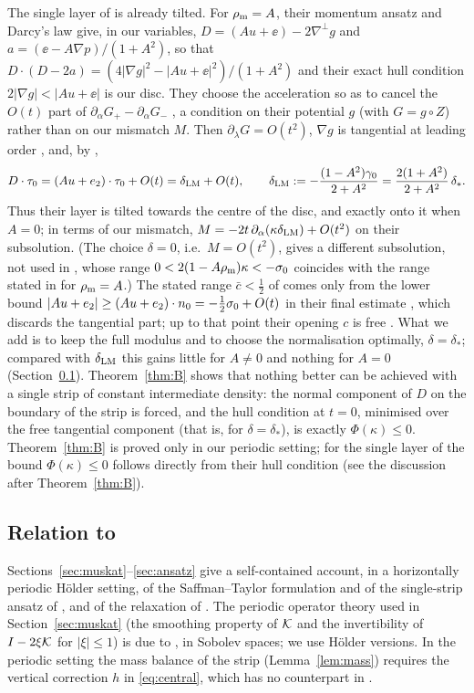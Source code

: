 The single layer of \cite{LM26} is already tilted. For $\rho_{\mathrm m}=A$, their momentum ansatz \cite[(4.6)]{LM26} and Darcy's law \cite[(4.10)]{LM26} give, in our variables, $D=(Au+\ee)-2\nabla^\perp g$ and
$a=(\ee-A\nabla p)/(1+A^2)$, so that $D\cdot(D-2a)=(4|\nabla g|^2-|Au+\ee|^2)/(1+A^2)$ and their exact hull condition $2|\nabla g|<|Au+\ee|$ \cite[(4.14)]{LM26} is our disc. They choose the
acceleration so as to cancel the $O(t)$ part of $\partial_\alpha G_+-\partial_\alpha G_-$ \cite[Sec.~3.3.4 and Lemma~5.3]{LM26}, a condition on their potential $g$ (with $G=g\circ Z$) rather than on
our mismatch $M$. Then $\partial_\lambda G=O(t^2)$, $\nabla g$ is tangential at leading order \cite[Props.~7.2--7.3]{LM26}, and, by \cite[(4.10), (7.11) and (3.7b)]{LM26},
\[
D\cdot\tau_0=(Au+e_2)\cdot\tau_0+O(t)=\delta_{\rm LM}+O(t),\qquad \delta_{\rm LM}:=-\frac{(1-A^2)\gamma_0}{2+A^2}=\frac{2(1+A^2)}{2+A^2}\,\delta_* .
\]
Thus their layer is tilted towards the centre of the disc, and exactly onto it when $A=0$; in terms of our mismatch, $M=-2t\,\partial_\alpha(\kappa\delta_{\rm LM})+O(t^2)$ on their subsolution. (The choice
$\delta=0$, i.e.\ $M=O(t^2)$, gives a different subsolution, not used in \cite{LM26}, whose range $0<2(1-A\rho_{\mathrm m})\kappa<-\sigma_0$ coincides with the range stated in \cite{LM26} for $\rho_{\mathrm m}=A$.) The stated
range $\bar c<\frac12$ of \cite{LM26} comes only from the lower bound $|Au+e_2|\ge(Au+e_2)\cdot n_0=-\frac12\sigma_0+O(t)$ in their final estimate \cite[Sec.~7.4]{LM26}, which discards the tangential
part; up to that point their opening $c$ is free \cite[(5.1)]{LM26}. What we add is to keep the full modulus and to choose the normalisation optimally, $\delta=\delta_*$; compared with $\delta_{\rm LM}$
this gains little for $A\ne0$ and nothing for $A=0$ (Section~\ref{x:relation}). Theorem~\ref{thm:B} shows that nothing better can be achieved with a single strip of constant intermediate density: the
normal component of $D$ on the boundary of the strip is forced, and the hull condition at $t=0$, minimised over the free tangential component (that is, for $\delta=\delta_*$), is exactly
$\Phi(\kappa)\le0$. Theorem~\ref{thm:B} is proved only in our periodic setting; for the single layer of \cite{LM26} the bound $\Phi(\kappa)\le0$ follows directly from their hull condition
\cite[(4.14)]{LM26} (see the discussion after Theorem~\ref{thm:B}).

\subsection{Relation to \cite{LM26}}\label{x:relation}
Sections~\ref{sec:muskat}--\ref{sec:ansatz} give a self-contained account, in a horizontally periodic H\"older setting, of the Saffman--Taylor formulation and of the single-strip ansatz of \cite{LM26},
and of the relaxation of \cite{Men22}. The periodic operator theory used in Section~\ref{sec:muskat} (the smoothing property of $\mathcal{K}$ and the invertibility of $I-2\xi\mathcal{K}$ for $|\xi|\le1$) is due to
\cite{CCG11}, in Sobolev spaces; we use H\"older versions. In the periodic setting the mass balance of the strip (Lemma~\ref{lem:mass}) requires the vertical correction $h$ in \eqref{eq:central}, which has
no counterpart in \cite{LM26}.

